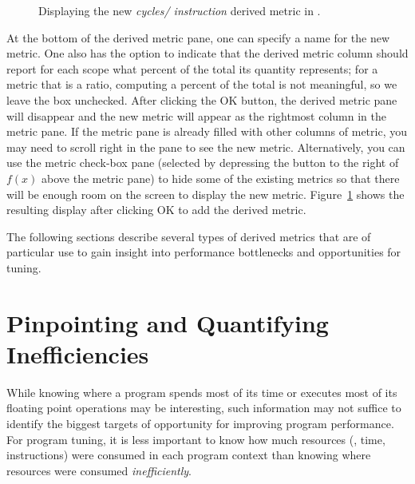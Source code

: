 \documentclass[11pt,twoside,letterpaper]{report}
\begin{document}
\begin{figure}[t]
\caption{Displaying the new {\em cycles/ instruction} derived metric in \hpcviewer{}.}
\label{fig:cycles-per-inst-2}
\end{figure}

At the bottom of the derived metric pane, one can specify a name for the new metric.
One also has the option to indicate that the derived metric column should report for each scope what percent of the total its quantity represents; for a metric that is a ratio, computing a percent of the total is not meaningful, so we leave the box unchecked.
After clicking the OK button, the derived metric pane will disappear and the new metric will appear as the rightmost column in the metric pane.
If the metric pane is already filled with other columns of metric, you may need to scroll right in the pane to see the new metric.
Alternatively, you can use the metric check-box pane (selected by depressing the button to the right of $f(x)$ above the metric pane) to hide some of the existing metrics so that there will be enough room on the screen to display the new metric.
Figure~\ref{fig:cycles-per-inst-2} shows the resulting \hpcviewer{} display after clicking OK to add the derived metric.

The following sections describe several types of derived metrics that are of particular use to gain insight into performance bottlenecks and opportunities for tuning.


\section{Pinpointing and Quantifying Inefficiencies}
\label{sec:effective-performance-analysis:inefficiencies}

While knowing where a program spends most of its time or executes most of its floating point operations may be interesting, such information may not suffice to identify the biggest targets of opportunity for improving program performance.
For program tuning, it is less important to know how much resources (\eg, time, instructions) were consumed in each program context than knowing where resources were consumed {\em inefficiently}.
\end{document}
